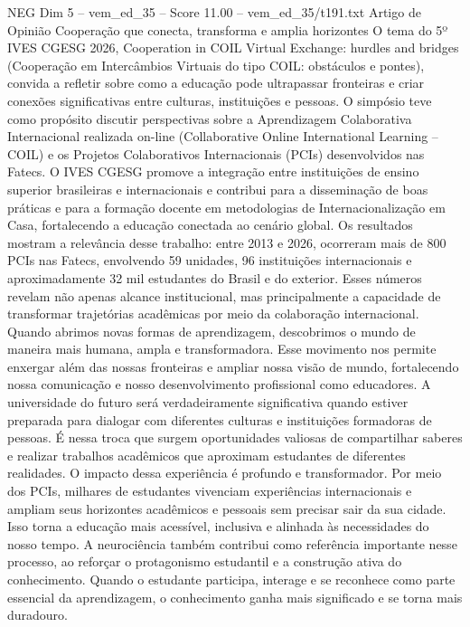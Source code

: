 \begin{textsample}{NEG Dim 5 – vem\_ed\_35 – Score 11.00 – vem\_ed\_35/t191.txt}  \label{ex:f5_neg_165}
Artigo de Opinião Cooperação que conecta, transforma e amplia horizontes O tema do 5º IVES CGESG 2026, Cooperation in COIL Virtual Exchange: hurdles and bridges (Cooperação em Intercâmbios Virtuais do tipo COIL: obstáculos e pontes), convida a refletir sobre como a educação pode ultrapassar fronteiras e criar conexões significativas entre culturas, instituições e pessoas.
O simpósio teve como propósito discutir perspectivas sobre a Aprendizagem Colaborativa Internacional realizada on-line (Collaborative Online International Learning – COIL) e os Projetos Colaborativos Internacionais (PCIs) desenvolvidos nas Fatecs.
O IVES CGESG promove a integração entre instituições de ensino superior brasileiras e internacionais e contribui para a disseminação de boas práticas e para a formação docente em metodologias de Internacionalização em Casa, fortalecendo a educação conectada ao cenário global.
Os resultados mostram a relevância desse trabalho: entre 2013 e 2026, ocorreram mais de 800 PCIs nas Fatecs, envolvendo 59 unidades, 96 instituições internacionais e aproximadamente 32 mil estudantes do Brasil e do exterior.
Esses números revelam não apenas alcance institucional, mas principalmente a capacidade de transformar trajetórias acadêmicas por meio da colaboração internacional.
Quando abrimos novas formas de aprendizagem, descobrimos o mundo de maneira mais humana, ampla e transformadora.
Esse movimento nos permite enxergar além das nossas fronteiras e ampliar nossa visão de mundo, fortalecendo nossa comunicação e nosso desenvolvimento profissional como educadores.
A universidade do futuro será verdadeiramente significativa quando estiver preparada para dialogar com diferentes culturas e instituições formadoras de pessoas.
É nessa troca que surgem oportunidades valiosas de compartilhar saberes e realizar trabalhos acadêmicos que aproximam estudantes de diferentes realidades.
O impacto dessa experiência é profundo e transformador.
Por meio dos PCIs, milhares de estudantes vivenciam experiências internacionais e ampliam seus horizontes acadêmicos e pessoais sem precisar sair da sua cidade.
Isso torna a educação mais acessível, inclusiva e alinhada às necessidades do nosso tempo.
A neurociência também contribui como referência importante nesse processo, ao reforçar o protagonismo estudantil e a construção ativa do conhecimento.
Quando o estudante participa, interage e se reconhece como parte essencial da aprendizagem, o conhecimento ganha mais significado e se torna mais duradouro.

\end{textsample}
